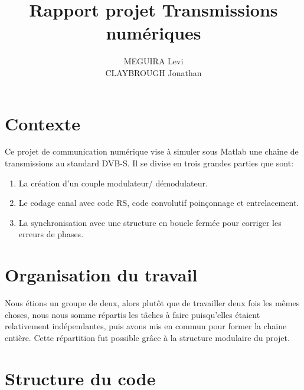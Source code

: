 \documentclass[a4paper,10pt]{article}
\title{Rapport projet Transmissions numériques}
\author{MEGUIRA Levi \\
	CLAYBROUGH Jonathan}
\begin{document}
\maketitle

\begin{comment}
	\textbf{Remarque importante: Notre chaine de transmission ne \emph{donne pas l'air} de transmettre \emph{un} signal complexe mais bien deux signaux distincts qui subissent exactement les mêmes opérations. Afin de respecter au possible le schéma de l'énoncé ainsi que le principe de ne jamais répeter de code en Matlab, il importe de créer un signal numérique \emph{réelement complexe} (sans jeu de mot) à partir des bits de départ et de transmettre un seul et même objet d'une extrémité à l'autre. \\ Le caractère universel des fonctions Matlab suffit à faire appliquer toutes les fonctions utilisés dans ce code à un vecteur complexe définie par \texttt{symboles=bitsI+j*bitsQ}}
\end{comment}


\section*{Contexte}
Ce projet de communication numérique vise à simuler sous Matlab une chaîne de transmissions au standard DVB-S. Il se divise en trois grandes parties que sont:
\begin{enumerate}
	\item La création d'un couple modulateur/ démodulateur.
	\item Le codage canal avec code RS, code convolutif poinçonnage et entrelacement.
	\item La synchronisation avec une structure en boucle fermée pour corriger les erreurs de phases.
\end{enumerate}

\tableofcontents

\section{Organisation du travail}
Nous étions un groupe de deux, alors plutôt que de travailler deux fois les mêmes choses, nous nous somme répartis les tâches à faire puisqu'elles étaient relativement indépendantes, puis avons mis en commun pour former la chaine entière. 
\newline
Cette répartition fut possible grâce à la structure modulaire du projet. 

\section{Structure du code}
\end{document}
